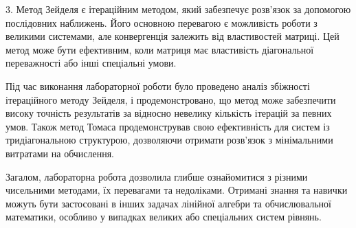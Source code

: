 \documentclass[a4paper, 12pt]{article}
\begin{document}
3. Метод Зейделя є ітераційним методом, який забезпечує розв'язок за
допомогою послідовних наближень. Його основною перевагою є можливість роботи з
великими системами, але конвергенція залежить від властивостей матриці. Цей
метод може бути ефективним, коли матриця має властивість діагональної
переважності або інші спеціальні умови.

Під час виконання лабораторної роботи було проведено аналіз збіжності
ітераційного методу Зейделя, і продемонстровано, що метод може забезпечити
високу точність результатів за відносно невелику кількість ітерацій за певних
умов. Також метод Томаса продемонстрував свою ефективність для систем із
тридіагональною структурою, дозволяючи отримати розв'язок з мінімальними
витратами на обчислення.

Загалом, лабораторна робота дозволила глибше ознайомитися з різними чисельними
методами, їх перевагами та недоліками. Отримані знання та навички можуть бути
застосовані в інших задачах лінійної алгебри та обчислювальної математики,
особливо у випадках великих або спеціальних систем рівнянь.
\end{document}
